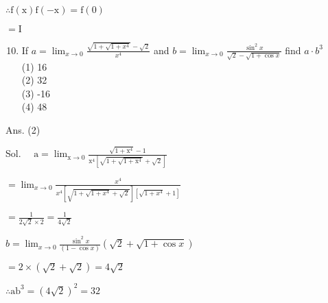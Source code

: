\documentclass[10pt]{article}
\begin{document}
$\therefore \mathrm{f}(\mathrm{x}) \mathrm{f}(-\mathrm{x})=\mathrm{f}(0)$

$=\mathrm{I}$

\begin{enumerate}
  \setcounter{enumi}{9}
  \item If $a=\lim _{x \rightarrow 0} \frac{\sqrt{1+\sqrt{1+x^{4}}}-\sqrt{2}}{x^{4}}$ and $b=\lim _{x \rightarrow 0} \frac{\sin ^{2} x}{\sqrt{2}-\sqrt{1+\cos x}}$ find $a \cdot b^{3}$\\
(1) 16\\
(2) 32\\
(3) -16\\
(4) 48
\end{enumerate}

Ans. (2)

Sol. $\quad \mathrm{a}=\lim _{\mathrm{x} \rightarrow 0} \frac{\sqrt{1+\mathrm{x}^{4}}-1}{\mathrm{x}^{4}\left[\sqrt{1+\sqrt{1+\mathrm{x}^{4}}}+\sqrt{2}\right]}$

$=\lim _{x \rightarrow 0} \frac{x^{4}}{x^{4}\left[\sqrt{1+\sqrt{1+x^{4}}+\sqrt{2}}\right]\left[\sqrt{1+x^{4}}+1\right]}$

$=\frac{1}{2 \sqrt{2} \times 2}=\frac{1}{4 \sqrt{2}}$

$b=\lim _{x \rightarrow 0} \frac{\sin ^{2} x}{(1-\cos x)}(\sqrt{2}+\sqrt{1+\cos x})$

$=2 \times(\sqrt{2}+\sqrt{2})=4 \sqrt{2}$

$\therefore \mathrm{ab}^{3}=(4 \sqrt{2})^{2}=32$
\end{document}
